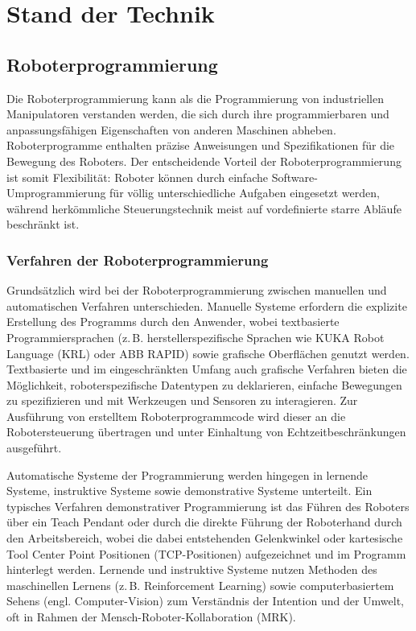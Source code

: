 \chapter{Stand der Technik} \label{cap:Grundlagen}

\section{Roboterprogrammierung}
Die Roboterprogrammierung kann als die
Programmierung von industriellen Manipulatoren verstanden werden, die sich durch
ihre programmierbaren und anpassungsfähigen Eigenschaften von anderen Maschinen
abheben. Roboterprogramme enthalten präzise Anweisungen und Spezifikationen für
die Bewegung des Roboters. Der entscheidende
Vorteil der Roboterprogrammierung ist somit Flexibilität: Roboter
können durch einfache Software-Umprogrammierung für völlig unterschiedliche
Aufgaben eingesetzt werden, während herkömmliche Steuerungstechnik meist auf
vordefinierte starre Abläufe beschränkt ist.

\subsection{Verfahren der Roboterprogrammierung}
Grundsätzlich wird bei der Roboterprogrammierung zwischen manuellen und
automatischen Verfahren unterschieden.
Manuelle Systeme erfordern die explizite Erstellung des Programms
durch den Anwender, wobei textbasierte Programmiersprachen (z.\,B.
  herstellerspezifische Sprachen wie KUKA Robot Language (KRL) oder ABB
RAPID) sowie grafische Oberflächen genutzt werden. Textbasierte und
im eingeschränkten Umfang auch grafische Verfahren bieten
die Möglichkeit, roboterspezifische
Datentypen zu deklarieren, einfache Bewegungen zu spezifizieren und
mit Werkzeugen und Sensoren zu interagieren. Zur Ausführung von
erstelltem Roboterprogrammcode wird dieser an die Robotersteuerung übertragen
und unter Einhaltung von Echtzeitbeschränkungen
ausgeführt.

Automatische Systeme der Programmierung werden hingegen in
lernende Systeme, instruktive Systeme sowie demonstrative Systeme
unterteilt. Ein typisches Verfahren demonstrativer Programmierung ist das
Führen des Roboters über ein Teach Pendant oder durch die direkte
Führung der Roboterhand durch den Arbeitsbereich, wobei die dabei
entstehenden Gelenkwinkel oder
kartesische Tool Center Point Positionen (TCP-Positionen)
aufgezeichnet und im Programm hinterlegt werden. Lernende und instruktive
Systeme
nutzen Methoden des maschinellen Lernens (z.\,B. Reinforcement Learning) sowie
computerbasiertem Sehens (engl. Computer-Vision) zum Verständnis der Intention
und der Umwelt, oft in Rahmen der Mensch-Roboter-Kollaboration
(MRK).

